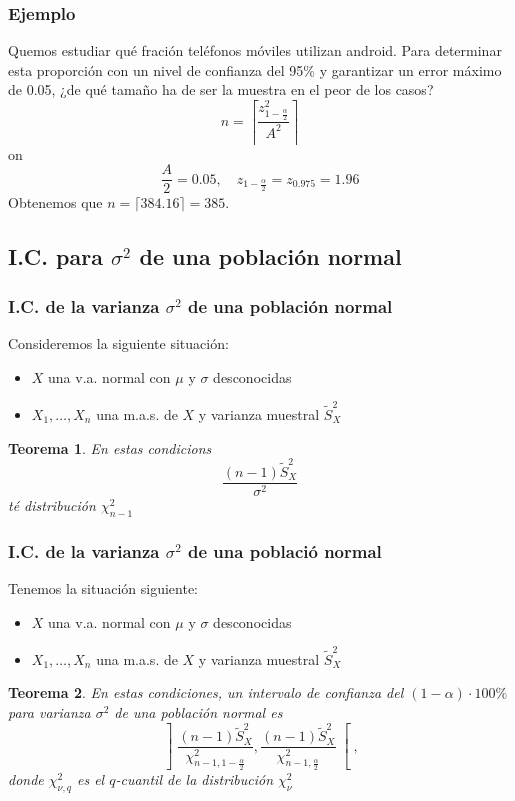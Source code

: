 \documentclass[12pt,t]{beamer}
\renewcommand{\emph}[1]{{\color{red}#1}}
\theoremstyle{plain}
\newtheorem{teorema}{Teorema}
\theoremstyle{definition}
\begin{document}
\begin{frame}
\frametitle{Ejemplo}
Quemos estudiar qué fración teléfonos móviles utilizan android. Para determinar esta proporción con un  nivel de confianza  del 95\%
y garantizar un error máximo de 0.05, ¿de qué  tamaño  ha de ser la muestra \emph{en el peor de los casos}?
$$
n=\left\lceil\frac{z_{1-\frac{\alpha}{2}}^2}{A^2}\right\rceil
$$
on
$$
\frac{A}{2}=0.05,\quad z_{1-\frac{\alpha}{2}}=z_{0.975}=1.96
$$
Obtenemos que  $n= \lceil 384.16\rceil=385$.

\end{frame}




\subsection{I.C. para $\sigma^2$ de una población normal}

\begin{frame}
\frametitle{I.C. de la varianza $\sigma^2$ de una población normal}



Consideremos  la siguiente situación:
\begin{itemize}
\item  $X$ una v.a. normal con $\mu$ y $\sigma$ desconocidas

\item $X_1,\ldots,X_n$ una m.a.s. de $X$ y varianza muestral $\widetilde{S}_X^2$
\end{itemize}


\begin{teorema}
En estas  condicions
$$
\frac{(n-1) \tilde{S}_{X}^2}{\sigma^2}
$$
té distribución $\chi^2_{n-1}$
\end{teorema}
\end{frame}

\begin{frame}
\frametitle{I.C. de la varianza $\sigma^2$ de una població normal}
Tenemos  la situación siguiente:

\begin{itemize}
\item  $X$ una v.a. normal con $\mu$ y $\sigma$ desconocidas
\item $X_1,\ldots,X_n$ una m.a.s. de $X$ y varianza muestral $\widetilde{S}_X^2$
\end{itemize}

\begin{teorema}
En estas  condiciones,  un intervalo  de confianza  del $(1-\alpha)\cdot 100\%$ para varianza $\sigma^2$ de una población normal es 
$$
\left] \frac{(n-1)\widetilde{S}_{X}^2}{\chi_{n-1,1-\frac{\alpha}{2}}^2},
\frac{(n-1)\widetilde{S}_{X}^2}{\chi_{n-1,\frac{\alpha}{2}}^2}
\right[,
$$
donde $\chi_{\nu,q}^2$ es el $q$-cuantil de la distribución $\chi_{\nu}^2$
\end{teorema}
\end{frame}
\end{document}

